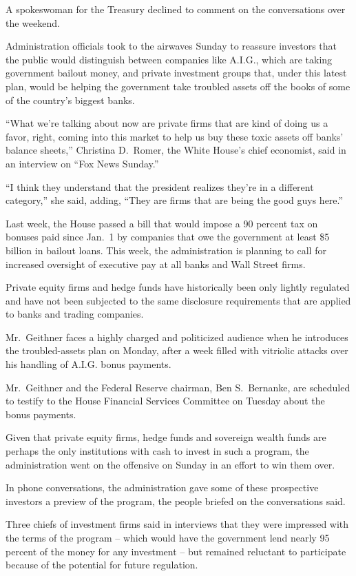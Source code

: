 \documentclass[12pt,a4paper,onecolumn]{article}
\begin{document}
\begin{CJK*}{GBK}{song}
A spokeswoman for the Treasury declined to comment on the conversations over the weekend.

Administration officials took to the airwaves Sunday to reassure investors that the public would
distinguish between companies like A.I.G., which are taking government bailout money, and private
investment groups that, under this latest plan, would be helping the government take troubled assets
off the books of some of the country's biggest banks.

``What we're talking about now are private firms that are kind of doing us a favor, right, coming
into this market to help us buy these toxic assets off banks' balance sheets,'' Christina D.~Romer,
the White House's chief economist, said in an interview on ``Fox News Sunday.''

``I think they understand that the president realizes they're in a different category,'' she said,
adding, ``They are firms that are being the good guys here.''

Last week, the House passed a bill that would impose a 90 percent tax on bonuses paid since Jan.~1
by companies that owe the government at least \$5 billion in bailout loans. This week, the
administration is planning to call for increased oversight of executive pay at all banks and Wall
Street firms.

Private equity firms and hedge funds have historically been only lightly regulated and have not been
subjected to the same disclosure requirements that are applied to banks and trading companies.

Mr.~Geithner faces a highly charged and politicized audience when he introduces the troubled-assets
plan on Monday, after a week filled with vitriolic attacks over his handling of A.I.G. bonus
payments.

Mr.~Geithner and the Federal Reserve chairman, Ben S.~Bernanke, are scheduled to testify to the
House Financial Services Committee on Tuesday about the bonus payments.

Given that private equity firms, hedge funds and sovereign wealth funds are perhaps the only
institutions with cash to invest in such a program, the administration went on the offensive on
Sunday in an effort to win them over.

In phone conversations, the administration gave some of these prospective investors a preview of the
program, the people briefed on the conversations said.

Three chiefs of investment firms said in interviews that they were impressed with the terms of the
program -- which would have the government lend nearly 95 percent of the money for any investment --
but remained reluctant to participate because of the potential for future regulation.


\end{CJK*}
\end{document}
